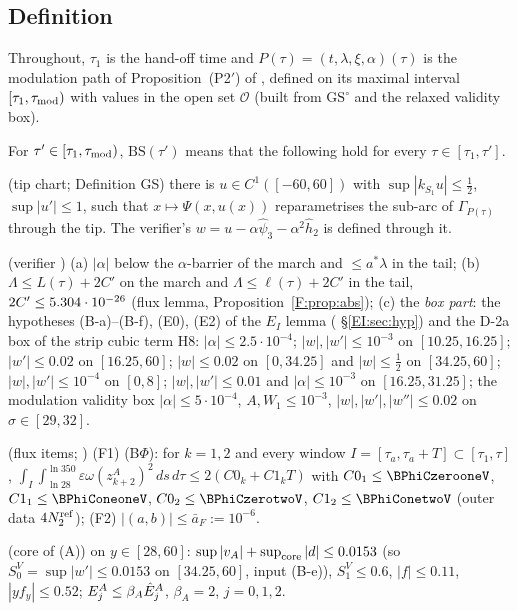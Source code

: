 \documentclass[11pt]{article}
\begin{document}
\subsection{Definition}
Throughout, $\tau_1$ is the hand-off time and $P(\tau)=(t,\lambda,\xi,\alpha)(\tau)$ is the modulation path of Proposition~(P2$'$) of , defined on its maximal interval $[\tau_1,\tau_{\rm mod})$ with values in the open set $\mathcal O$ (built from $\mathrm{GS}^\circ$ and the relaxed validity box).
\begin{definition}\label{BS:def}
For $\tau'\in[\tau_1,\tau_{\rm mod})$, $\mathrm{BS}(\tau')$ means that the following hold for every $\tau\in[\tau_1,\tau']$.
\begin{description}[leftmargin=1.3em,itemsep=2pt]
\item[GS] (tip chart;  Definition GS) there is $u\in C^1([-60,60])$ with $\sup|k_{S_1}u|\le\frac12$, $\sup|u'|\le1$, such that $x\mapsto\Psi(x,u(x))$ reparametrises the sub-arc of $\Gamma_{P(\tau)}$ through the tip. The verifier's $w=u-\alpha\hat\psi_3-\alpha^2\hat h_2$ is defined through it.
\item[B1] (verifier ) (a) $|\alpha|$ below the $\alpha$-barrier of the march and $\le a^*\lambda$ in the tail; (b) $\Lambda\le L(\tau)+2C'$ on the march and $\Lambda\le\ell(\tau)+2C'$ in the tail, $2C'\le5.304\cdot10^{-26}$ (flux lemma, Proposition~\ref{F:prop:abs}); (c) the \emph{box part}: the hypotheses (B-a)--(B-f), (E0), (E2) of the $E_I$ lemma ( \S\ref{EI:sec:hyp}) and the D-2a box of the strip cubic term H8: $|\alpha|\le2.5\cdot10^{-4}$; $|w|,|w'|\le10^{-3}$ on $[10.25,16.25]$; $|w'|\le0.02$ on $[16.25,60]$; $|w|\le0.02$ on $[0,34.25]$ and $|w|\le\frac12$ on $[34.25,60]$; $|w|,|w'|\le10^{-4}$ on $[0,8]$; $|w|,|w'|\le0.01$ and $|\alpha|\le10^{-3}$ on $[16.25,31.25]$; the modulation validity box $|\alpha|\le5\cdot10^{-4}$, $A,W_1\le10^{-3}$, $|w|,|w'|,|w''|\le0.02$ on $\sigma\in[29,32]$.
\item[BF] (flux items; ) (F1) (B$\Phi$): for $k=1,2$ and every window $I=[\tau_a,\tau_a+T]\subset[\tau_1,\tau]$, $\int_I\int_{\ln28}^{\ln350}\varepsilon\omega(z^A_{k+2})^2\,ds\,d\tau\le2(C0_k+C1_kT)$ with $C0_1\le\BPhiCzerooneV$, $C1_1\le\BPhiConeoneV$, $C0_2\le\BPhiCzerotwoV$, $C1_2\le\BPhiConetwoV$ (outer data $4N_2^{\rm ref}$); (F2) $|(a,b)|\le\bar a_F:=10^{-6}$.
\item[B2$'$] (core of (A)) on $y\in[28,60]$: $\sup|v_A|+\sup_{\rm core}|d|\le0.0153$ (so $S^V_0=\sup|w'|\le0.0153$ on $[34.25,60]$, input (B-e)), $S^V_1\le0.6$, $|f|\le0.11$, $|yf_y|\le0.52$; $E^A_j\le\beta_A\hat E^A_j$, $\beta_A=2$, $j=0,1,2$.

\end{description}
\end{definition}
\end{document}
